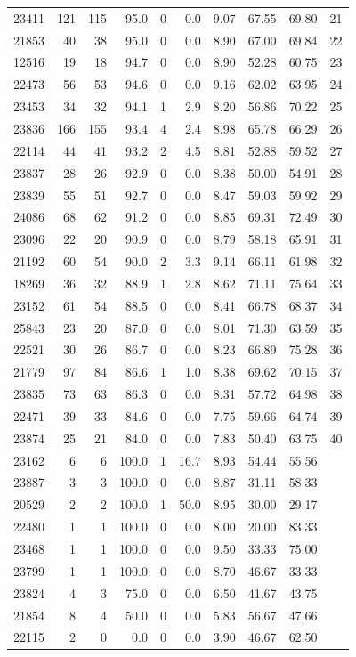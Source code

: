 \begin{longtable}{lrrrrrrrrr}
23411 & 121 & 115 & 95.0 & 0 & 0.0 & 9.07 & 67.55 & 69.80 & 21 \\
21853 & 40 & 38 & 95.0 & 0 & 0.0 & 8.90 & 67.00 & 69.84 & 22 \\
12516 & 19 & 18 & 94.7 & 0 & 0.0 & 8.90 & 52.28 & 60.75 & 23 \\
22473 & 56 & 53 & 94.6 & 0 & 0.0 & 9.16 & 62.02 & 63.95 & 24 \\
23453 & 34 & 32 & 94.1 & 1 & 2.9 & 8.20 & 56.86 & 70.22 & 25 \\
23836 & 166 & 155 & 93.4 & 4 & 2.4 & 8.98 & 65.78 & 66.29 & 26 \\
22114 & 44 & 41 & 93.2 & 2 & 4.5 & 8.81 & 52.88 & 59.52 & 27 \\
23837 & 28 & 26 & 92.9 & 0 & 0.0 & 8.38 & 50.00 & 54.91 & 28 \\
23839 & 55 & 51 & 92.7 & 0 & 0.0 & 8.47 & 59.03 & 59.92 & 29 \\
24086 & 68 & 62 & 91.2 & 0 & 0.0 & 8.85 & 69.31 & 72.49 & 30 \\
23096 & 22 & 20 & 90.9 & 0 & 0.0 & 8.79 & 58.18 & 65.91 & 31 \\
21192 & 60 & 54 & 90.0 & 2 & 3.3 & 9.14 & 66.11 & 61.98 & 32 \\
18269 & 36 & 32 & 88.9 & 1 & 2.8 & 8.62 & 71.11 & 75.64 & 33 \\
23152 & 61 & 54 & 88.5 & 0 & 0.0 & 8.41 & 66.78 & 68.37 & 34 \\
25843 & 23 & 20 & 87.0 & 0 & 0.0 & 8.01 & 71.30 & 63.59 & 35 \\
22521 & 30 & 26 & 86.7 & 0 & 0.0 & 8.23 & 66.89 & 75.28 & 36 \\
21779 & 97 & 84 & 86.6 & 1 & 1.0 & 8.38 & 69.62 & 70.15 & 37 \\
23835 & 73 & 63 & 86.3 & 0 & 0.0 & 8.31 & 57.72 & 64.98 & 38 \\
22471 & 39 & 33 & 84.6 & 0 & 0.0 & 7.75 & 59.66 & 64.74 & 39 \\
23874 & 25 & 21 & 84.0 & 0 & 0.0 & 7.83 & 50.40 & 63.75 & 40 \\
23162 & 6 & 6 & 100.0 & 1 & 16.7 & 8.93 & 54.44 & 55.56 &  \\
23887 & 3 & 3 & 100.0 & 0 & 0.0 & 8.87 & 31.11 & 58.33 &  \\
20529 & 2 & 2 & 100.0 & 1 & 50.0 & 8.95 & 30.00 & 29.17 &  \\
22480 & 1 & 1 & 100.0 & 0 & 0.0 & 8.00 & 20.00 & 83.33 &  \\
23468 & 1 & 1 & 100.0 & 0 & 0.0 & 9.50 & 33.33 & 75.00 &  \\
23799 & 1 & 1 & 100.0 & 0 & 0.0 & 8.70 & 46.67 & 33.33 &  \\
23824 & 4 & 3 & 75.0 & 0 & 0.0 & 6.50 & 41.67 & 43.75 &  \\
21854 & 8 & 4 & 50.0 & 0 & 0.0 & 5.83 & 56.67 & 47.66 &  \\
22115 & 2 & 0 & 0.0 & 0 & 0.0 & 3.90 & 46.67 & 62.50 &  \\
\bottomrule
\end{longtable}
\endgroup

